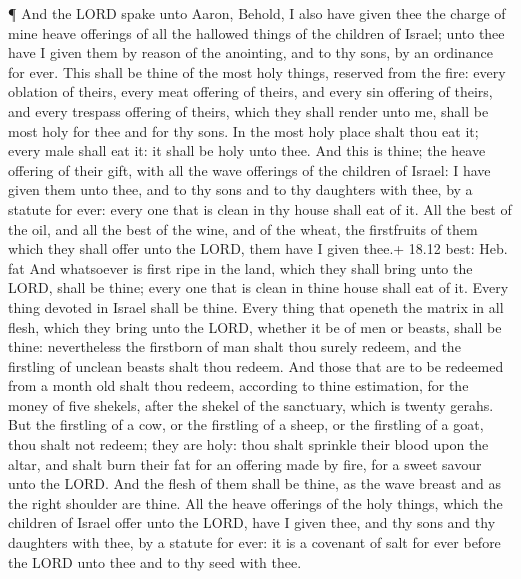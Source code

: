  ¶ And the LORD spake unto Aaron, Behold, I also have given
thee the charge of mine heave offerings of all the hallowed things of
the children of Israel; unto thee have I given them by reason of the
anointing, and to thy sons, by an ordinance for ever.  This
shall be thine of the most holy things, reserved from the fire: every
oblation of theirs, every meat offering of theirs, and every sin
offering of theirs, and every trespass offering of theirs, which they
shall render unto me, shall be most holy for thee and for thy sons.
 In the most holy place shalt thou eat it; every male shall
eat it: it shall be holy unto thee.  And this is thine; the
heave offering of their gift, with all the wave offerings of the
children of Israel: I have given them unto thee, and to thy sons and to
thy daughters with thee, by a statute for ever: every one that is clean
in thy house shall eat of it.  All the best of the oil, and
all the best of the wine, and of the wheat, the firstfruits of them
which they shall offer unto the LORD, them have I given thee.+ 18.12
best: Heb. fat  And whatsoever is first ripe in the land,
which they shall bring unto the LORD, shall be thine; every one that is
clean in thine house shall eat of it.  Every thing devoted
in Israel shall be thine.  Every thing that openeth the
matrix in all flesh, which they bring unto the LORD, whether it be of
men or beasts, shall be thine: nevertheless the firstborn of man shalt
thou surely redeem, and the firstling of unclean beasts shalt thou
redeem.  And those that are to be redeemed from a month old
shalt thou redeem, according to thine estimation, for the money of five
shekels, after the shekel of the sanctuary, which is twenty gerahs.
 But the firstling of a cow, or the firstling of a sheep,
or the firstling of a goat, thou shalt not redeem; they are holy: thou
shalt sprinkle their blood upon the altar, and shalt burn their fat for
an offering made by fire, for a sweet savour unto the LORD.
 And the flesh of them shall be thine, as the wave breast
and as the right shoulder are thine.  All the heave
offerings of the holy things, which the children of Israel offer unto
the LORD, have I given thee, and thy sons and thy daughters with thee,
by a statute for ever: it is a covenant of salt for ever before the LORD
unto thee and to thy seed with thee.

